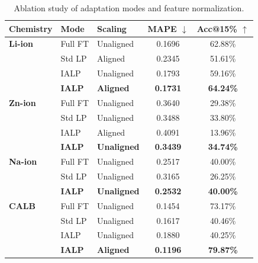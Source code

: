 \documentclass[a4paper,fleqn]{cas-dc}
\begin{document}
\begin{table}[t]
\caption{Ablation study of adaptation modes and feature normalization.}
\label{tbl:ablation}
\centering
\footnotesize
\begin{tabular}{lllcc}
\toprule
Chemistry & Mode & Scaling & MAPE $\downarrow$ & Acc@15\% $\uparrow$ \\
\midrule
\textbf{Li-ion} & Full FT & Unaligned & 0.1696 & 62.88\% \\
& Std LP & Aligned & 0.2345 & 51.61\% \\
& IALP & Unaligned & 0.1793 & 59.16\% \\
& \textbf{IALP} & \textbf{Aligned} & \textbf{0.1731} & \textbf{64.24\%} \\
\midrule
\textbf{Zn-ion} & Full FT & Unaligned & 0.3640 & 29.38\% \\
& Std LP & Unaligned & 0.3488 & 33.80\% \\
& IALP & Aligned & 0.4091 & 13.96\% \\
& \textbf{IALP} & \textbf{Unaligned} & \textbf{0.3439} & \textbf{34.74\%} \\
\midrule
\textbf{Na-ion} & Full FT & Unaligned & 0.2517 & 40.00\% \\
& Std LP & Unaligned & 0.3165 & 26.25\% \\
& \textbf{IALP} & \textbf{Unaligned} & \textbf{0.2532} & \textbf{40.00\%} \\
\midrule
\textbf{CALB} & Full FT & Unaligned & 0.1454 & 73.17\% \\
& Std LP & Unaligned & 0.1617 & 40.46\% \\
& IALP & Unaligned & 0.1880 & 40.25\% \\
& \textbf{IALP} & \textbf{Aligned} & \textbf{0.1196} & \textbf{79.87\%} \\
\bottomrule
\end{tabular}
\end{table}
\end{document}
